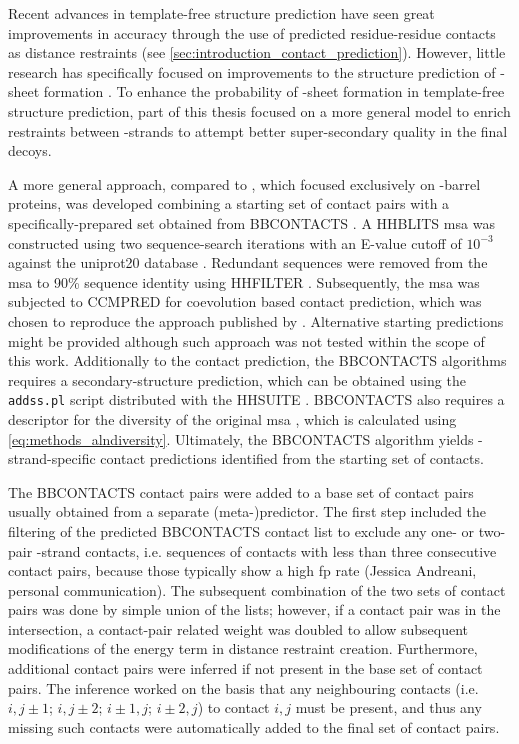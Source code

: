Recent advances in template-free structure prediction have seen great improvements in accuracy through the use of predicted residue-residue contacts as distance restraints (see \cref{sec:introduction_contact_prediction}). However, little research has specifically focused on improvements to the structure prediction of \textbeta-sheet formation \cite{Hayat2015-ut}. To enhance the probability of \textbeta-sheet formation in template-free structure prediction, part of this thesis focused on a more general model to enrich restraints between \textbeta-strands to attempt better super-secondary quality in the final decoys.

A more general approach, compared to \textcite{Hayat2015-ut}, which focused exclusively on \textbeta-barrel proteins, was developed combining a starting set of contact pairs with a specifically-prepared set obtained from BBCONTACTS \cite{Andreani2015-qn}. A HHBLITS \cite{Remmert2011-kt} \gls{msa} was constructed using two sequence-search iterations with an E-value cutoff of $10^{-3}$ against the uniprot20 database \cite{The_UniProt_Consortium2017-pb}. Redundant sequences were removed from the \gls{msa} to 90\% sequence identity using HHFILTER \cite{Remmert2011-kt}. Subsequently, the \gls{msa} was subjected to CCMPRED \cite{Seemayer2014-zp} for coevolution based contact prediction, which was chosen to reproduce the approach published by \textcite{Andreani2015-qn}. Alternative starting predictions might be provided although such approach was not tested within the scope of this work. Additionally to the contact prediction, the BBCONTACTS algorithms requires a secondary-structure prediction, which can be obtained using the \texttt{addss.pl} script \cite{Remmert2011-kt} distributed with the HHSUITE \cite{Soding2005-hw}. BBCONTACTS also requires a descriptor for the diversity of the original \gls{msa} \cite{Andreani2015-qn}, which is calculated using \cref{eq:methods_alndiversity}. Ultimately, the BBCONTACTS algorithm yields \textbeta-strand-specific contact predictions identified from the starting set of contacts.

The BBCONTACTS contact pairs were added to a base set of contact pairs usually obtained from a separate (meta-)predictor. The first step included the filtering of the predicted BBCONTACTS contact list to exclude any one- or two-pair \textbeta-strand contacts, i.e. sequences of contacts with less than three consecutive contact pairs, because those typically show a high \gls{fp} rate (Jessica Andreani, personal communication). The subsequent combination of the two sets of contact pairs was done by simple union of the lists; however, if a contact pair was in the intersection, a contact-pair related weight was doubled to allow subsequent modifications of the energy term in distance restraint creation. Furthermore, additional contact pairs were inferred if not present in the base set of contact pairs. The inference worked on the basis that any neighbouring contacts (i.e. $i,j\pm1$; $i,j\pm2$; $i\pm  1,j$; $i\pm2,j$) to contact $i,j$ must be present, and thus any missing such contacts were automatically added to the final set of contact pairs. 

